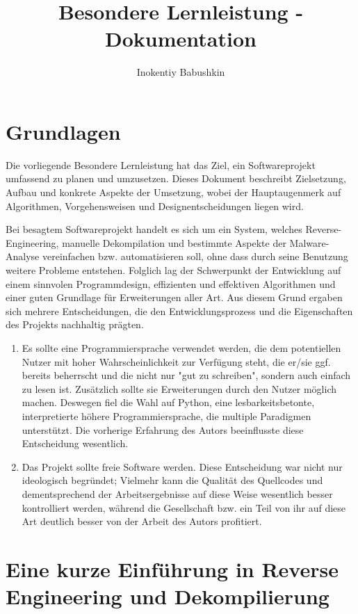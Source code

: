 \documentclass[11pt]{article}
\title{Besondere Lernleistung - Dokumentation}
\author{Inokentiy Babushkin}
\date{}
\begin{document}
\maketitle
\tableofcontents

\section{Grundlagen}
Die vorliegende Besondere Lernleistung hat das Ziel, ein Softwareprojekt
umfassend zu planen und umzusetzen.
Dieses Dokument beschreibt Zielsetzung, Aufbau und konkrete Aspekte der Umsetzung,
wobei der Hauptaugenmerk auf Algorithmen, Vorgehensweisen und Designentscheidungen liegen wird.

Bei besagtem Softwareprojekt handelt es sich um ein System, welches Reverse-Engineering, manuelle
Dekompilation und bestimmte Aspekte der Malware-Analyse vereinfachen bzw. automatisieren soll,
ohne dass durch seine Benutzung weitere Probleme entstehen. Folglich lag der Schwerpunkt der Entwicklung
auf einem sinnvolen Programmdesign, effizienten und effektiven Algorithmen und einer guten Grundlage
für Erweiterungen aller Art. Aus diesem Grund ergaben sich mehrere Entscheidungen, die den Entwicklungsprozess
und die Eigenschaften des Projekts nachhaltig prägten.
\begin{enumerate}
	\item{Es sollte eine Programmiersprache verwendet werden, die dem potentiellen Nutzer mit hoher
		Wahrscheinlichkeit zur Verfügung steht, die er/sie ggf. bereits beherrscht und die nicht nur
		"gut zu schreiben", sondern auch einfach zu lesen ist. Zusätzlich sollte sie Erweiterungen
		durch den Nutzer möglich machen. Deswegen fiel die Wahl auf Python, eine lesbarkeitsbetonte,
		interpretierte höhere Programmiersprache, die multiple Paradigmen unterstützt.
		Die vorherige Erfahrung des Autors beeinflusste diese Entscheidung wesentlich.
	}
	\item{Das Projekt sollte freie Software werden. Diese Entscheidung war nicht nur ideologisch begründet;
		Vielmehr kann die Qualität des Quellcodes und dementsprechend der Arbeitsergebnisse auf diese Weise
		wesentlich besser kontrolliert werden, während die Gesellschaft bzw. ein Teil von ihr auf diese
		Art deutlich besser von der Arbeit des Autors profitiert.
	}
\end{enumerate}

\section{Eine kurze Einführung in Reverse Engineering und Dekompilierung}
\end{document}
